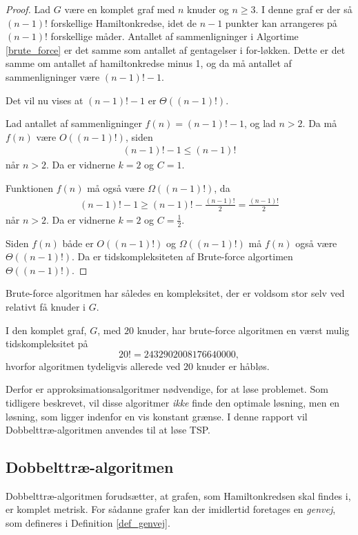 \begin{proof}
	Lad $G$ være en komplet graf med $n$ knuder og $n \geq 3$.
	I denne graf er der så $(n-1)!$ forskellige Hamiltonkredse, idet de $n-1$ punkter kan arrangeres på $(n-1)!$ forskellige måder.
	Antallet af sammenligninger i Algortime \ref{brute_force} er det samme som antallet af gentagelser i for-løkken.
	Dette er det samme om antallet af hamiltonkredse minus 1, og da må antallet af sammenligninger være $(n-1)! -1$.  	

	Det vil nu vises at $(n-1)! -1$ er $\Theta((n-1)!)$.

	Lad antallet af sammenligninger $f(n) = (n-1)! -1$, og lad $n > 2$.
	Da må $f(n)$ være $O((n-1)!)$, siden
	\begin{align*}
		(n-1)! -1 \leq (n-1)!
	\end{align*}
	når $n>2$. Da er vidnerne $k=2$ og $C=1$.
	
	Funktionen $f(n)$ må også være $\Omega((n-1)!)$, da
	\begin{align*}
		(n-1)! -1 \geq (n-1)! - \frac{(n-1)!}{2} = \frac{(n-1)!}{2}
	\end{align*}
	når $n>2$. Da er vidnerne $k=2$ og $C=\frac{1}{2}$.

	Siden $f(n)$ både er $O((n-1)!)$ og $\Omega((n-1)!)$ må $f(n)$ også være $\Theta((n-1)!)$. Da er tidskompleksiteten af Brute-force algortimen $\Theta((n-1)!)$.
\end{proof}

Brute-force algoritmen har således en kompleksitet, der er voldsom stor selv ved relativt få knuder i $G$.

\begin{exmp}
I den komplet graf, $G$, med $20$ knuder, har brute-force algoritmen en værst mulig tidskompleksitet på $$20! = 2432902008176640000,$$ hvorfor algoritmen tydeligvis allerede ved $20$ knuder er håbløs.
\end{exmp}

Derfor er approksimationsalgoritmer nødvendige, for at løse problemet. Som tidligere beskrevet, vil disse algoritmer \textit{ikke} finde den optimale løsning, men en løsning, som ligger indenfor en vis konstant grænse. I denne rapport vil Dobbelttræ-algoritmen anvendes til at løse TSP. 

\subsection{Dobbelttræ-algoritmen}
Dobbelttræ-algoritmen forudsætter, at grafen, som Hamiltonkredsen skal findes i, er komplet metrisk. For sådanne grafer kan der imidlertid foretages en \textit{genvej}, som defineres i Definition \ref{def_genvej}.

